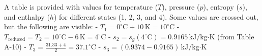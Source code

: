 A table is provided with values for temperature (\(T\)), pressure (\(p\)), entropy (\(s\)), and enthalpy (\(h\)) for different states (1, 2, 3, and 4). Some values are crossed out, but the following are visible:  
- \(T_1 = 0^\circ\text{C} + 10 \, \text{K} = 10^\circ\text{C}\)  
- \(T_{\text{reduced}} = T_2 = 10^\circ\text{C} - 6 \, \text{K} = 4^\circ\text{C}\)  
- \(s_2 = s_g(4^\circ\text{C}) = 0.9165 \, \text{kJ/kg·K}\) (from Table A-10)  
- \(T_3 = \frac{31.33 + 4}{2} = 37.1^\circ\text{C}\)  
- \(s_3 = (0.9374 - 0.9165) \, \text{kJ/kg·K}\)